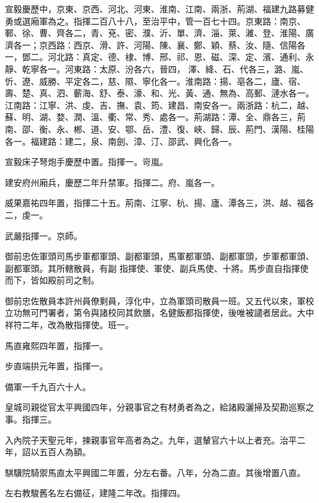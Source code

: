 \begin{pinyinscope}
 宣毅慶歷中，京東、京西、河北、河東、淮南、江南、兩浙、荊湖、福建九路募健勇或選廂軍為之。指揮二百八十八，至治平中，管一百七十四。京東路：南京、鄆、徐、曹、齊各二，青、兗、密、濮、沂、單、濟、淄、萊、濰、登、淮陽、廣濟各一；京西路：西京、滑、許、河陽、陳、襄、鄭、穎、蔡、汝、隨、信陽各一，鄧二。河北路：真定、德、棣、博、邢、祁、恩、磁、深、定、濱、通利、永靜、乾寧各一。河東路：太原、汾各六，晉四，
 澤、絳、石、代各三，潞、嵐、忻、遼、威勝、平定各二，慈、隰、寧化各一。淮南路：揚、亳各二，廬、宿、壽、楚、真、泗、蘄海、舒、泰、濠、和、光、黃、通、無為、高郵、漣水各一。江南路：江寧、洪、虔、吉、撫、袁、筠、建昌、南安各一。兩浙路：杭二，越、蘇、明、湖、婺、潤、溫、衢、常、秀、處各一。荊湖路：潭、全、鼎各三，荊南、邵、衡、永、郴、道、安、鄂、岳、澧、復、峽、歸、辰、荊門、漢陽、桂陽各一。福建路：建二，泉、南劍、漳、汀、邵武、興化各一。



 宣毅床子弩炮手慶歷中置。指揮一。岢嵐。



 建安府州廂兵，慶歷二年升禁軍。指揮二。府、嵐各一。



 威果嘉祐四年置，指揮二十五。荊南、江寧、杭、揚、廬、潭各三，洪、越、福各二，虔一。



 武嚴指揮一。京師。



 御前忠佐軍頭司馬步軍都軍頭、副都軍頭，馬軍都軍頭、副都軍頭，步軍都軍頭、副都軍頭。其所轄散員，有副
 指揮使、軍使、副兵馬使、十將。馬步直自指揮使而下，皆如殿前司之制。



 御前忠佐散員本許州員僚剩員，淳化中，立為軍頭司散員一班。又五代以來，軍校立功無可門署者，第令與諸校同其飲膳，名健飯都指揮使，後唯被譴者居此。大中祥符二年，改為散指揮使。班一。



 馬直雍熙四年置，指揮一。



 步直端拱元年置，指揮一。



 備軍一千九百六十人。



 皇城司親從官太平興國四年，分親事官之有材勇者為之，給諸殿灑掃及契勘巡察之事。指揮三。



 入內院子天聖元年，揀親事官年高者為之。九年，選輦官六十以上者充。治平二年，詔以五百人為額。



 騏驥院騎禦馬直太平興國二年置，分左右番。八年，分為二直。其後增置八直。



 左右教駿舊名左右備征，建隆二年改。指揮四。



\end{pinyinscope}